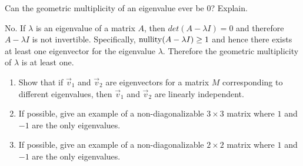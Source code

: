 \begin{exercises}
\begin{problist}
		\prob Can the geometric multiplicity of an eigenvalue ever be $0$?
		Explain.


		\begin{solution}
			No. If $\lambda$ is an eigenvalue of a matrix $A$, then $det(A -
			\lambda I)=0$ and therefore $A - \lambda I$ is not invertible. Specifically,
			$\operatorname{nullity}(A - \lambda I) \geq 1$ and hence there exists at least one
			eigenvector for the eigenvalue $\lambda$. Therefore the geometric
			multiplicity of $\lambda$ is at least one.
		\end{solution}\prob
		\begin{enumerate}
			\item Show that if $\vec v_{1}$ and $\vec v_{2}$ are eigenvectors for
				a matrix $M$ corresponding to different eigenvalues, then $\vec
				v_{1}$ and $\vec v_{2}$ are linearly independent.

			\item If possible, give an example of a non-diagonalizable $3\times
				3$ matrix where $1$ and $-1$ are the only eigenvalues.

			\item If possible, give an example of a non-diagonalizable $2\times
				2$ matrix where $1$ and $-1$ are the only eigenvalues.
		\end{enumerate}
	\end{problist}
\end{exercises}
